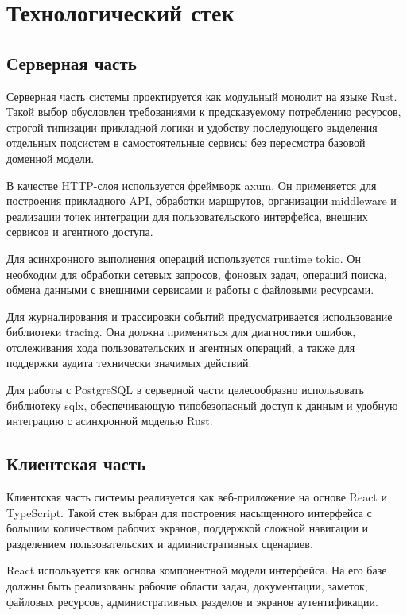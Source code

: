 \section{Технологический стек}

\subsection{Серверная часть}

\headingtextsep

Серверная часть системы проектируется как модульный монолит на языке Rust. Такой выбор обусловлен требованиями к предсказуемому потреблению ресурсов, строгой типизации прикладной логики и удобству последующего выделения отдельных подсистем в самостоятельные сервисы без пересмотра базовой доменной модели.

В качестве HTTP-слоя используется фреймворк axum. Он применяется для построения прикладного API, обработки маршрутов, организации middleware и реализации точек интеграции для пользовательского интерфейса, внешних сервисов и агентного доступа.

Для асинхронного выполнения операций используется runtime tokio. Он необходим для обработки сетевых запросов, фоновых задач, операций поиска, обмена данными с внешними сервисами и работы с файловыми ресурсами.

Для журналирования и трассировки событий предусматривается использование библиотеки tracing. Она должна применяться для диагностики ошибок, отслеживания хода пользовательских и агентных операций, а также для поддержки аудита технически значимых действий.

Для работы с PostgreSQL в серверной части целесообразно использовать библиотеку sqlx, обеспечивающую типобезопасный доступ к данным и удобную интеграцию с асинхронной моделью Rust.

\textheadingsep
\subsection{Клиентская часть}

\headingtextsep

Клиентская часть системы реализуется как веб-приложение на основе React и TypeScript. Такой стек выбран для построения насыщенного интерфейса с большим количеством рабочих экранов, поддержкой сложной навигации и разделением пользовательских и административных сценариев.

React используется как основа компонентной модели интерфейса. На его базе должны быть реализованы рабочие области задач, документации, заметок, файловых ресурсов, административных разделов и экранов аутентификации.

